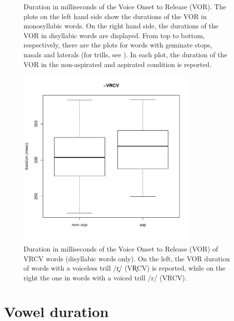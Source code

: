 \documentclass[11pt,a4paper,openany]{memoir}\usepackage[]{graphicx}\usepackage[]{color}
\newenvironment{knitrout}{}{} %
\begin{document}
\begin{figure}
\begin{subfigure}{.5\textwidth}
\begin{knitrout}
\end{knitrout}
\end{subfigure}
\caption{\footnotesize Duration in milliseconds of the Voice Onset to Release (VOR).
The plots on the left hand side show the durations of the VOR in monosyllabic words.
On the right hand side, the durations of the VOR in disyllabic words are displayed.
From top to bottom, respectively, there are the plots for words with geminate stops, nasals and laterals (for trills, see ).
In each plot, the duration of the VOR in the non-aspirated and aspirated condition is reported.
}
\label{f:vor}
\end{figure}

\begin{figure}
\centering
\begin{knitrout}
\color{fgcolor}
\includegraphics[width=0.8\textwidth]{img/di-rho-vor-1} 

\end{knitrout}
\caption{Duration in milliseconds of the Voice Onset to Release (VOR) of VRCV words (disyllabic words only).
On the left, the VOR duration of words with a voiceless trill /r̥/ (VR̥CV) is reported, while on the right the one in words with a voiced trill /r/ (VRCV).}
\label{f:vor-rho}
\end{figure}


\section{Vowel duration}
\label{s:vow-dur}
\end{document}
